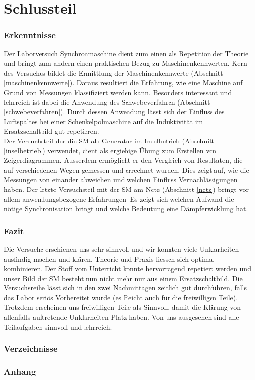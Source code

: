 \part{Schlussteil}



\section{Erkenntnisse}
Der Laborversuch \flqq{}Synchronmaschine\frqq{} dient zum einen als Repetition der Theorie und bringt zum andern einen praktischen Bezug zu Maschinenkennwerten. Kern des Versuches bildet die Ermittlung der Maschinenkennwerte (Abschnitt \ref{maschinenkennwerte}). Daraus resultiert die Erfahrung, wie eine Maschine auf Grund von Messungen klassifiziert werden kann. Besonders interessant und lehrreich ist dabei die Anwendung des Schwebeverfahren (Abschnitt \ref{schwebeverfahren}). Durch dessen Anwendung lässt sich der Einfluss des Luftspaltes bei einer Schenkelpolmaschine auf die Induktivität im Ersatzschaltbild gut repetieren.\\
Der Versuchsteil der die SM als Generator im Inselbetrieb (Abschnitt \ref{inselbetrieb}) verwendet, dient als ergiebige Übung zum Erstellen von Zeigerdiagrammen. Ausserdem ermöglicht er den Vergleich von Resultaten, die auf verschiedenen Wegen gemessen und errechnet wurden. Dies zeigt auf, wie die Messungen von einander abweichen und welchen Einfluss Vernachlässigungen haben. Der letzte Versuchsteil mit der SM am Netz (Abschnitt \ref{netz}) bringt vor allem anwendungsbezogene Erfahrungen. Es zeigt sich welchen Aufwand die nötige Synchronisation bringt und welche Bedeutung eine Dämpferwicklung hat.   


\section{Fazit} %
Die Versuche erschienen uns sehr sinnvoll und wir konnten viele Unklarheiten ausfindig machen und klären. Theorie und Praxis liessen sich optimal kombinieren. Der Stoff vom Unterricht konnte hervorragend repetiert werden und unser Bild der SM besteht nun nicht mehr nur aus einem Ersatzschaltbild. Die Versuchsreihe lässt sich in den zwei Nachmittagen zeitlich gut durchführen, falls das Labor seriös Vorbereitet wurde (es Reicht auch für die freiwilligen Teile). Trotzdem erscheinen uns freiwilligen Teile als Sinnvoll, damit die Klärung von allenfalls auftretende Unklarheiten Platz haben. Von uns ausgesehen sind alle Teilaufgaben sinnvoll und lehrreich.



\section{Verzeichnisse}

\listoffigures

\section{Anhang}